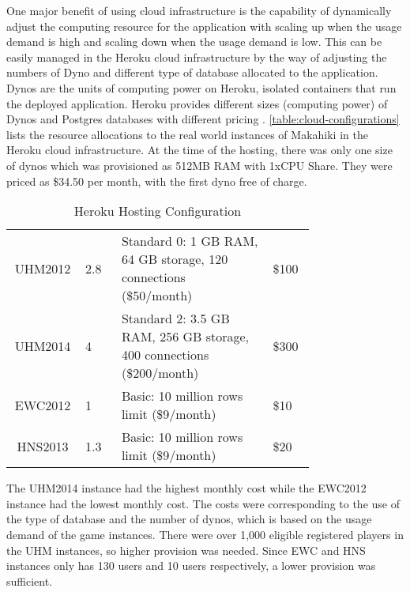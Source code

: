 One major benefit of using cloud infrastructure is the capability of dynamically adjust the computing resource for the application with scaling up when the usage demand is high and scaling down when the usage demand is low. This can be easily managed in the Heroku cloud infrastructure by the way of adjusting the numbers of Dyno and different type of database allocated to the application. Dynos are the units of computing power on Heroku, isolated containers that run the deployed application. Heroku provides different sizes (computing power) of Dynos and Postgres databases with different pricing \cite{heroku-pricing}. \autoref{table:cloud-configurations} lists the resource allocations to the real world instances of Makahiki in the Heroku cloud infrastructure. At the time of the hosting, there was only one size of dynos which was provisioned as 512MB RAM with 1xCPU Share. They were priced as \$34.50 per month, with the first dyno free of charge.

\begin{table}[ht!]
  \centering
  \begin{tabular} {|c|P{0.12\linewidth}|P{0.5\linewidth}|P{0.14\linewidth}|}
    \hline
     &
     &
     &
     \\
    \hline
    UHM2012 & 2.8 & Standard 0:  1 GB RAM, 64 GB storage, 120 connections (\$50/month) & \$100 \\
    \hline
    UHM2014 & 4 & Standard 2: 3.5 GB RAM, 256 GB storage, 400 connections (\$200/month) & \$300 \\
    \hline
    EWC2012 & 1 & Basic: 10 million rows limit (\$9/month) & \$10 \\
    \hline
    HNS2013 & 1.3 & Basic: 10 million rows limit (\$9/month) & \$20 \\
    \hline
  \end{tabular}
  \caption{Heroku Hosting Configuration}
  \label{table:cloud-configurations}
\end{table}

The UHM2014 instance had the highest monthly cost while the EWC2012 instance had the lowest monthly cost. The costs were corresponding to the use of the type of database and the number of dynos, which is based on the usage demand of the game instances. There were over 1,000 eligible registered players in the UHM instances, so higher provision was needed. Since EWC and HNS instances only has 130 users and 10 users respectively, a lower provision was sufficient. 

